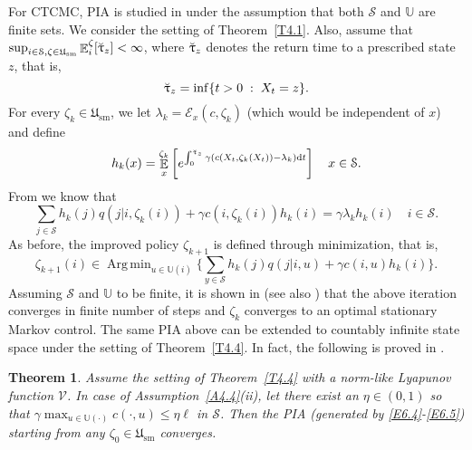 \documentclass[notitlepage,11pt,reqno]{amsart}
\numberwithin{equation}{section}
\theoremstyle{plain}
\newtheorem{theorem}{Theorem}[section]
\theoremstyle{definition}
\theoremstyle{remark}
\newcommand{\Act}{{\mathds{U}}}
\newcommand{\uuptau}{{\Breve{\uptau}}}
\newcommand{\sE}{{\mathscr{E}}}     %
\newcommand{\cS}{{\mathcal{S}}}     %
\newcommand{\Lyap}{{\mathscr{V}}}   %
\newcommand{\Usm}{\mathfrak{U}_{\mathrm{sm}}}
\DeclareMathOperator{\Exp}{\mathbb{E}} %
\newcommand{\D}{\mathrm{d}} %
\DeclareMathOperator*{\Argmin}{Arg\,min}
\begin{document}
For CTCMC, PIA is studied in \cite{MR3230073,MR4276515} under the assumption that both $\cS$ and $\Act$ are finite sets. We consider the setting of Theorem~\ref{T4.1}.
Also, assume that $\sup_{i\in\cS, \zeta\in\Usm}\Exp_i^\zeta[\uuptau_z]<\infty$, where $\uuptau_z$ denotes the return time to a prescribed state $z$, that is,
$$\uuptau_z=\inf\{t>0\; :\; X_t=z\}.$$
For every $\zeta_k\in\Usm$, we let $\lambda_k=\sE_x(c, \zeta_k)$ (which would be independent of $x$) and define
$$h_k(x)=\Exp_x^{\zeta_k}\left[e^{\int_0^{\uuptau_z}\gamma(c(X_t, \zeta_k(X_t))-\lambda_k)\D{t}}\right]\quad x\in\cS.$$
From \cite{MR3230073} we know that 
\begin{equation}\label{E6.4}
\sum_{j\in\cS} h_k(j) q(j|i, \zeta_k(i)) + \gamma c(i, \zeta_k(i))h_k(i)= \gamma \lambda_k h_k(i) \quad i\in\cS.
\end{equation}
As before, the improved policy $\zeta_{k+1}$ is defined through  minimization, that is,
\begin{equation}\label{E6.5}
\zeta_{k+1}(i)\in\Argmin_{u\in\Act(i)}\{\sum_{y\in\cS} h_k(j) q(j|i, u) + \gamma c(i, u)h_k(i)\}.
\end{equation}
Assuming $\cS$ and $\Act$ to be finite, it is shown in \cite[Theorem~5.1]{MR3230073} (see also \cite[Lemma~6.1]{MR4276515}) that the above iteration converges in
finite number of steps and $\zeta_k$ converges to an optimal stationary Markov control. The same PIA above can be extended to countably infinite state space 
under the setting of Theorem~\ref{T4.4}. In fact, the following is proved in \cite[Theorem~4.3]{MR4429406}.
\begin{theorem}
Assume the setting of Theorem~\ref{T4.4} with a norm-like Lyapunov
function $\Lyap$. In case of Assumption~\ref{A4.4}(ii),
let there exist an $\eta\in (0, 1)$ so that $\gamma\max_{u\in\Act(\cdot)}c(\cdot, u)\leq \eta\ell$ in $\cS$. 
Then the PIA (generated by \eqref{E6.4}-\eqref{E6.5}) starting from any $\zeta_0\in\Usm$ converges.
\end{theorem}
\end{document}
